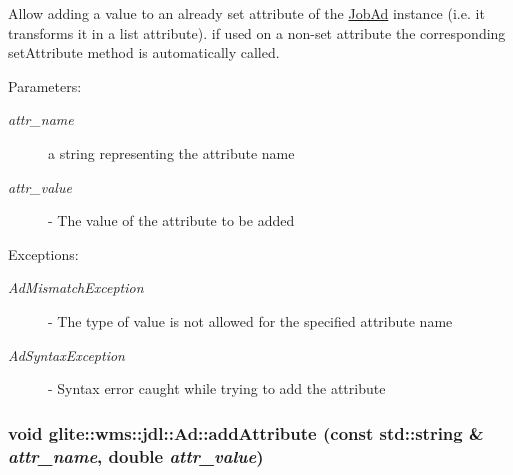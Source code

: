 Allow adding a value to an already set attribute of the \hyperlink{classglite_1_1wms_1_1jdl_1_1JobAd}{Job\-Ad} instance (i.e. it transforms it in a list attribute). if used on a non-set attribute the corresponding set\-Attribute method is automatically called. \begin{Desc}
\item[Parameters:]
\begin{description}
\item[{\em attr\_\-name}]a string representing the attribute name \item[{\em attr\_\-value}]- The value of the attribute to be added \end{description}
\end{Desc}
\begin{Desc}
\item[Exceptions:]
\begin{description}
\item[{\em Ad\-Mismatch\-Exception}]- The type of value is not allowed for the specified attribute name \item[{\em Ad\-Syntax\-Exception}]- Syntax error caught while trying to add the attribute \end{description}
\end{Desc}
\hypertarget{classglite_1_1wms_1_1jdl_1_1Ad_z19_3}{
\subsubsection[addAttribute]{\setlength{\rightskip}{0pt plus 5cm}void glite::wms::jdl::Ad::add\-Attribute (const std::string \& {\em attr\_\-name}, double {\em attr\_\-value})}}
\label{classglite_1_1wms_1_1jdl_1_1Ad_z19_3}


